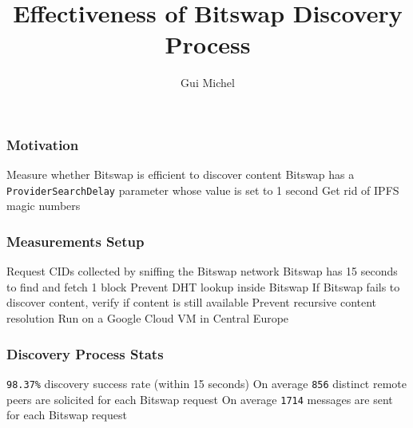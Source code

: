 \documentclass{pl-slide}
\title{Effectiveness of Bitswap Discovery Process }
\author{Gui Michel}
\institute{Protocol Labs}
\date{\DTMdate{2023-01-11}}
\begin{document}
\frame{\titlepage}

\begin{frame}
\frametitle{Motivation}
\begin{itemize}
	\itemc Measure whether Bitswap is efficient to discover content
	\itemc Bitswap has a \texttt{ProviderSearchDelay} parameter whose value is set to 1 second
	\itemc Get rid of IPFS magic numbers

\end{itemize}
\end{frame}

\begin{frame}
\frametitle{Measurements Setup}
\begin{itemize}
	\itemc Request CIDs collected by sniffing the Bitswap network
	\itemc Bitswap has 15 seconds to find and fetch 1 block
	\itemc Prevent DHT lookup inside Bitswap
	\itemc If Bitswap fails to discover content, verify if content is still available
	\itemc Prevent recursive content resolution
	\itemc Run on a Google Cloud VM in Central Europe
\end{itemize}
\end{frame}

\begin{frame}
\frametitle{Discovery Process Stats}
\begin{itemize}
	\itemc \texttt{98.37\%} discovery success rate (within 15 seconds)
	\itemc On average \texttt{856} distinct remote peers are solicited for each Bitswap request
	\itemc On average \texttt{1714} messages are sent for each Bitswap request
\end{itemize}
\end{frame}
\end{document}
